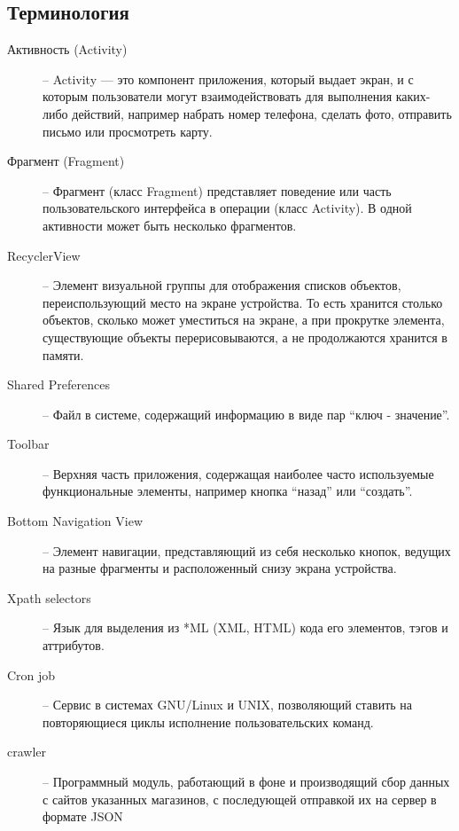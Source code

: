 \subsection{Терминология}
\begin{description}
    \item[Активность (Activity)] --
        Activity — это компонент приложения, который выдает экран, и с которым
        пользователи могут взаимодействовать для выполнения каких-либо
        действий, например набрать номер телефона, сделать фото, отправить
        письмо или просмотреть карту. 

    \item[Фрагмент (Fragment)] -- 
        Фрагмент (класс Fragment) представляет поведение или часть
        пользовательского интерфейса в операции (класс Activity). В одной
        активности может быть несколько фрагментов.

    \item[RecyclerView] -- 
        Элемент визуальной группы для отображения списков объектов,
        переиспользующий место на экране устройства. То есть хранится столько
        объектов, сколько может уместиться на экране, а при прокрутке элемента,
        существующие объекты перерисовываются, а не продолжаются хранится в
        памяти.

    \item[Shared Preferences] -- 
        Файл в системе, содержащий информацию в виде пар ``ключ - значение''.

    \item[Toolbar] --
        Верхняя часть приложения, содержащая наиболее часто используемые
        функциональные элементы, например кнопка ``назад'' или ``создать''.

    \item[Bottom Navigation View] -- 
        Элемент навигации, представляющий из себя несколько кнопок, ведущих на
        разные фрагменты и расположенный снизу экрана устройства.

    \item[Xpath selectors] -- 
        Язык для выделения из *ML (XML, HTML) кода его элементов, тэгов и аттрибутов.

    \item[Cron job] -- 
        Сервис в системах GNU/Linux и UNIX, позволяющий ставить на
        повторяющиеся циклы исполнение пользовательских команд.

    \item[crawler] --
            Программный модуль, работающий в фоне и производящий сбор данных с сайтов
            указанных магазинов, с последующей отправкой их на сервер в формате
            JSON


\end{description}

